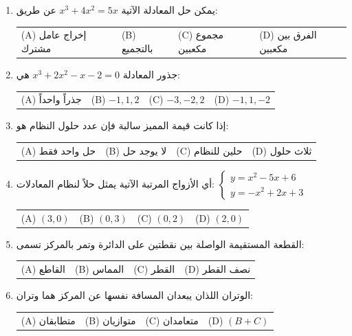 \documentclass[12pt, a4paper]{article}
\begin{document}
\begin{enumerate}[label=\textbf{\arabic*-}, itemsep=0.35cm, leftmargin=*]

\item يمكن حل المعادلة الآتية $x^3 + 4x^2 = 5x$ عن طريق:
\vspace{0.2cm} \\
\noindent\begin{tabularx}{\linewidth}{XXXX}
(A) إخراج عامل مشترك & (B) بالتجميع & (C) مجموع مكعبين & (D) الفرق بين مكعبين
\end{tabularx}

\item جذور المعادلة $x^3 + 2x^2 - x - 2 = 0$ هي:
\vspace{0.2cm} \\
\noindent\begin{tabularx}{\linewidth}{XXXX}
(A) جذراً واحداً & (B) $-1, 1, 2$ & (C) $-3, -2, 2$ & (D) $-1, 1, -2$
\end{tabularx}

\item إذا كانت قيمة المميز سالبة فإن عدد حلول النظام هو:
\vspace{0.2cm} \\
\noindent\begin{tabularx}{\linewidth}{XXXX}
(A) حل واحد فقط & (B) لا يوجد حل & (C) حلين للنظام & (D) ثلاث حلول
\end{tabularx}

\item أي الأزواج المرتبة الآتية يمثل حلاً لنظام المعادلات:
$\begin{cases} y = x^2 - 5x + 6 \\ y = -x^2 + 2x + 3 \end{cases}$
\vspace{0.2cm} \\
\noindent\begin{tabularx}{\linewidth}{XXXX}
(A) $(3,0)$ & (B) $(0,3)$ & (C) $(0,2)$ & (D) $(2,0)$
\end{tabularx}

\item القطعة المستقيمة الواصلة بين نقطتين على الدائرة وتمر بالمركز تسمى:
\vspace{0.2cm} \\
\noindent\begin{tabularx}{\linewidth}{XXXX}
(A) القاطع & (B) المماس & (C) القطر & (D) نصف القطر
\end{tabularx}

\item الوتران اللذان يبعدان المسافة نفسها عن المركز هما وتران:
\vspace{0.2cm} \\
\noindent\begin{tabularx}{\linewidth}{XXXX}
(A) متطابقان & (B) متوازيان & (C) متعامدان & (D) $(B+C)$
\end{tabularx}


\end{enumerate}
\end{document}
